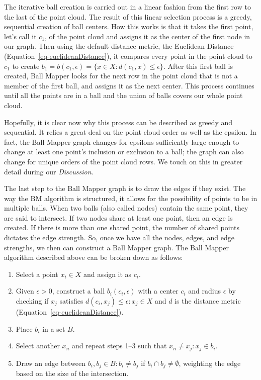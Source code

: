 \documentclass[
  10pt,
  letterpaper,
  DIV=11,
  numbers=noendperiod]{scrartcl}
\providecommand{\tightlist}{%
  \setlength{\itemsep}{0pt}\setlength{\parskip}{0pt}}
\begin{document}
The iterative ball creation is carried out in a linear fashion from the
first row to the last of the point cloud. The result of this linear
selection process is a greedy, sequential creation of ball centers. How
this works is that it takes the first point, let's call it \(c_1\), of
the point cloud and assigns it as the center of the first node in our
graph. Then using the default distance metric, the Euclidean Distance
(Equation~\ref{eq-euclideanDistance}), it compares every point in the
point cloud to \(c_1\) to create
\(b_1 = b(c_1, \epsilon) = \{x \in X : d(c_1, x) \leq \epsilon \}\).
After this first ball is created, Ball Mapper looks for the next row in
the point cloud that is not a member of the first ball, and assigns it
as the next center. This process continues until all the points are in a
ball and the union of balls covers our whole point cloud.

Hopefully, it is clear now why this process can be described as greedy
and sequential. It relies a great deal on the point cloud order as well
as the epsilon. In fact, the Ball Mapper graph changes for epsilons
sufficiently large enough to change at least one point's inclusion or
exclusion to a ball; the graph can also change for unique orders of the
point cloud rows. We touch on this in greater detail during our
\emph{Discussion}.

The last step to the Ball Mapper graph is to draw the edges if they
exist. The way the BM algorithm is structured, it allows for the
possibility of points to be in multiple balls. When two balls (also
called nodes) contain the same point, they are said to intersect. If two
nodes share at least one point, then an edge is created. If there is
more than one shared point, the number of shared points dictates the
edge strength. So, once we have all the nodes, edges, and edge
strengths, we then can construct a Ball Mapper graph. The Ball Mapper
algorithm described above can be broken down as follows:

\begin{enumerate}
\def\labelenumi{\arabic{enumi}.}
\tightlist
\item
  Select a point \(x_i \in X\) and assign it as \(c_i\).
\item
  Given \(\epsilon > 0\), construct a ball \(b_i(c_i, \epsilon)\) with a
  center \(c_i\) and radius \(\epsilon\) by checking if \(x_j\)
  satisfies \(d(c_i, x_j) \leq \epsilon : x_j \in X\) and \(d\) is the
  distance metric (Equation~\ref{eq-euclideanDistance}).
\item
  Place \(b_i\) in a set \(B\).
\item
  Select another \(x_n\) and repeat steps 1--3 such that
  \(x_n \neq x_j : x_j \in b_i\).
\item
  Draw an edge between \(b_i, b_j \in B : b_i \neq b_j\) if
  \(b_i \cap b_j \neq \emptyset\), weighting the edge based on the size
  of the intersection.
\end{enumerate}
\end{document}

